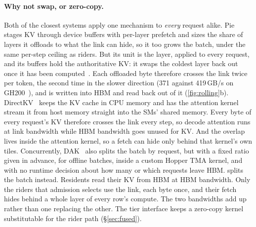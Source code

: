 \paragraph{Why not swap, or zero-copy.} Both of the closest systems apply one
mechanism to \emph{every} request alike. Pie~\cite{pie} stages KV through
device buffers with per-layer prefetch and sizes the share of layers it
offloads to what the link can hide, so it too grows the batch, under the same
per-step ceiling as riders. But its unit is the layer, applied to every
request, and its buffers hold the authoritative KV: it swaps the coldest layer
back out once it has been computed~\cite{pie}. Each offloaded byte therefore
crosses the link twice per token, the second time in the slower direction
(371 against 419\,GB/s on GH200~\cite{pie}), and is written into HBM and read
back out of it (\cref{fig:rolling}b). DirectKV~\cite{directkv} keeps the KV cache in CPU memory
and has the attention kernel stream it from host memory straight into the SMs'
shared memory. Every byte of every request's KV therefore crosses the link every
step, so decode attention runs at link bandwidth while HBM bandwidth goes unused
for KV. And the overlap lives inside the attention kernel, so a fetch can hide
only behind that kernel's own tiles. Concurrently, DAK~\cite{dak} also splits
the batch by request, but with a fixed ratio given in advance, for offline
batches, inside a custom Hopper TMA kernel, and with no runtime decision about
how many or which requests leave HBM.
\sysname{} splits the batch instead. Residents
read their KV from HBM at HBM bandwidth. Only the riders that admission selects
use the link, each byte once, and their fetch hides behind a whole layer of
every row's compute. The two bandwidths add up rather than one replacing the
other. The tier interface keeps a zero-copy kernel substitutable for the
rider path (\S\ref{sec:fused}).

